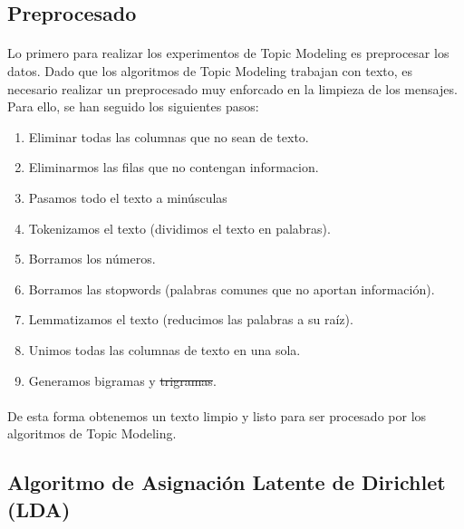 \documentclass{report}
\begin{document}
            \subsection{Preprocesado}
                \paragraph*{}{
                    Lo primero para realizar los experimentos de Topic Modeling es preprocesar los datos.
                    Dado que los algoritmos de Topic Modeling trabajan con texto, es necesario realizar un preprocesado muy enforcado en la limpieza de los mensajes.
                    Para ello, se han seguido los siguientes pasos:
                }
                \begin{enumerate}
                    \item Eliminar todas las columnas que no sean de texto.
                    \item Eliminarmos las filas que no contengan informacion.
                    \item Pasamos todo el texto a minúsculas
                    \item Tokenizamos el texto (dividimos el texto en palabras).
                    \item Borramos los números.
                    \item Borramos las stopwords (palabras comunes que no aportan información).
                    \item Lemmatizamos el texto (reducimos las palabras a su raíz).
                    \item Unimos todas las columnas de texto en una sola.
                    \item Generamos bigramas y \st{trigramas}.
                \end{enumerate}
                \paragraph*{}{
                    De esta forma obtenemos un texto limpio y listo para ser procesado por los algoritmos de Topic Modeling.
                }
            \subsection{Algoritmo de Asignación Latente de Dirichlet (LDA)}
\end{document}
